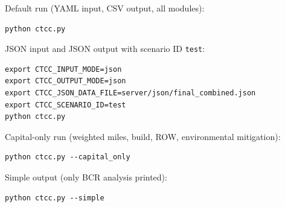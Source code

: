 \documentclass[ctcc_full_documentation.tex]{subfiles}
\begin{document}
Default run (YAML input, CSV output, all modules):
\begin{lstlisting}
python ctcc.py
\end{lstlisting}

JSON input and JSON output with scenario ID \texttt{test}:
\begin{lstlisting}
export CTCC_INPUT_MODE=json
export CTCC_OUTPUT_MODE=json
export CTCC_JSON_DATA_FILE=server/json/final_combined.json
export CTCC_SCENARIO_ID=test
python ctcc.py
\end{lstlisting}

Capital-only run (weighted miles, build, ROW, environmental mitigation):
\begin{lstlisting}
python ctcc.py --capital_only
\end{lstlisting}

Simple output (only BCR analysis printed):
\begin{lstlisting}
python ctcc.py --simple
\end{lstlisting}
\end{document}
